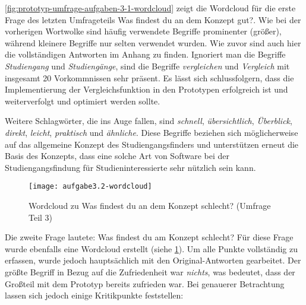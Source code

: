 \autoref{fig:prototyp-umfrage-aufgaben-3-1-wordcloud} zeigt die Wordcloud für die erste Frage des letzten Umfrageteils \glqq Was findest du an dem Konzept gut?\grqq{}. Wie bei der vorherigen Wortwolke sind häufig verwendete Begriffe prominenter (größer), während kleinere Begriffe nur selten verwendet wurden. Wie zuvor sind auch hier die vollständigen Antworten im Anhang zu finden. Ignoriert man die Begriffe \textit{Studiengang} und \textit{Studiengänge}, sind die Begriffe \textit{vergleichen} und \textit{Vergleich} mit insgesamt 20 Vorkommnissen sehr präsent. Es lässt sich schlussfolgern, dass die Implementierung der Vergleichsfunktion in den Prototypen erfolgreich ist und weiterverfolgt und optimiert werden sollte.

Weitere Schlagwörter, die ins Auge fallen, sind \textit{schnell}, \textit{übersichtlich}, \textit{Überblick}, \textit{direkt}, \textit{leicht}, \textit{praktisch} und \textit{ähnliche}. Diese Begriffe beziehen sich möglicherweise auf das allgemeine Konzept des Studiengangsfinders und unterstützen erneut die Basis des Konzepts, dass eine solche Art von Software bei der Studiengangsfindung für Studieninteressierte sehr nützlich sein kann.


\begin{figure}[H]
    \centering
    \texttt{[image: aufgabe3.2-wordcloud]}
    \caption{Wordcloud zu \glqq Was findest du an dem Konzept schlecht?\grqq{} (Umfrage Teil 3)}
    \label{fig:prototyp-umfrage-aufgaben-3-2-wordcloud}
\end{figure}

Die zweite Frage lautete: \glqq Was findest du am Konzept schlecht?\grqq{} Für diese Frage wurde ebenfalls eine Wordcloud erstellt (siehe \ref{fig:prototyp-umfrage-aufgaben-3-2-wordcloud}). Um alle Punkte vollständig zu erfassen, wurde jedoch hauptsächlich mit den Original-Antworten gearbeitet. Der größte Begriff in Bezug auf die Zufriedenheit war \textit{nichts}, was bedeutet, dass der Großteil mit dem Prototyp bereits zufrieden war. Bei genauerer Betrachtung lassen sich jedoch einige Kritikpunkte feststellen:

